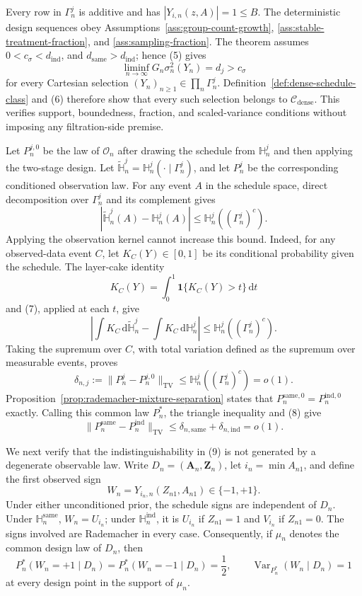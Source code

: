 Every row in \(\Gamma_n^j\) is additive and has \(|Y_{i,n}(z,A)|=1\le B\). The deterministic design sequences obey Assumptions~\ref{ass:group-count-growth}, \ref{ass:stable-treatment-fraction}, and \ref{ass:sampling-fraction}. The theorem assumes \(0<c_\sigma<d_{\mathrm{ind}}\), and \(d_{\mathrm{same}}>d_{\mathrm{ind}}\); hence (5) gives
\[
\liminf_{n\to\infty}G_n\sigma_n^2(Y_n)=d_j>c_\sigma
\tag{6}
\]
for every Cartesian selection \((Y_n)_{n\ge1}\in\prod_n\Gamma_n^j\). Definition~\ref{def:dense-schedule-class} and (6) therefore show that every such selection belongs to \(\mathcal C_{\mathrm{dense}}\). This verifies support, boundedness, fraction, and scaled-variance conditions without imposing any filtration-side premise.

Let \(P_n^{j,0}\) be the law of \(\mathcal O_n\) after drawing the schedule from \(\mathbb H_n^j\) and then applying the two-stage design. Let \(\widetilde{\mathbb H}_n^j=\mathbb H_n^j(\mathord\cdot\mid\Gamma_n^j)\), and let \(P_n^j\) be the corresponding conditioned observation law. For any event \(A\) in the schedule space, direct decomposition over \(\Gamma_n^j\) and its complement gives
\[
\left|\widetilde{\mathbb H}_n^j(A)-\mathbb H_n^j(A)\right|
\le \mathbb H_n^j((\Gamma_n^j)^c).
\tag{7}
\]
Applying the observation kernel cannot increase this bound. Indeed, for any observed-data event \(C\), let \(K_C(Y)\in[0,1]\) be its conditional probability given the schedule. The layer-cake identity
\[
K_C(Y)=\int_0^1\mathbf 1\{K_C(Y)>t\}\,\mathrm dt
\]
and (7), applied at each \(t\), give
\[
\left|\int K_C\,\mathrm d\widetilde{\mathbb H}_n^j
-\int K_C\,\mathrm d\mathbb H_n^j\right|
\le\mathbb H_n^j((\Gamma_n^j)^c).
\]
Taking the supremum over \(C\), with total variation defined as the supremum over measurable events, proves
\[
\delta_{n,j}:=\lVert P_n^j-P_n^{j,0}\rVert_{\mathrm{TV}}
\le \mathbb H_n^j((\Gamma_n^j)^c)=o(1).
\tag{8}
\]
Proposition~\ref{prop:rademacher-mixture-separation} states that \(P_n^{\mathrm{same},0}=P_n^{\mathrm{ind},0}\) exactly. Calling this common law \(P_n^*\), the triangle inequality and (8) give
\[
\lVert P_n^{\mathrm{same}}-P_n^{\mathrm{ind}}\rVert_{\mathrm{TV}}
\le\delta_{n,\mathrm{same}}+\delta_{n,\mathrm{ind}}=o(1).
\tag{9}
\]

We next verify that the indistinguishability in (9) is not generated by a degenerate observable law. Write \(D_n=(\mathbf A_n,\mathbf Z_n)\), let \(i_n=\min A_{n1}\), and define the first observed sign
\[
W_n=Y_{i_n,n}(Z_{n1},A_{n1})\in\{-1,+1\}.
\tag{10}
\]
Under either unconditioned prior, the schedule signs are independent of \(D_n\). Under \(\mathbb H_n^{\mathrm{same}}\), \(W_n=U_{i_n}\); under \(\mathbb H_n^{\mathrm{ind}}\), it is \(U_{i_n}\) if \(Z_{n1}=1\) and \(V_{i_n}\) if \(Z_{n1}=0\). The signs involved are Rademacher in every case. Consequently, if \(\mu_n\) denotes the common design law of \(D_n\), then
\[
P_n^*(W_n=+1\mid D_n)=P_n^*(W_n=-1\mid D_n)=\frac12,
\qquad
\operatorname{Var}_{P_n^*}(W_n\mid D_n)=1
\tag{11}
\]
at every design point in the support of \(\mu_n\).

